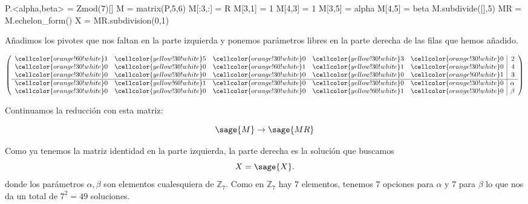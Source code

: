 \documentclass{amsart}
\def\z{\mathbb{Z}}
\begin{document}
\begin{sageblock}
P.<alpha,beta> = Zmod(7)[]
M = matrix(P,5,6)
M[:3,:] = R
M[3,1] = 1
M[4,3] = 1
M[3,5] = alpha
M[4,5] = beta
M.subdivide([],5)
MR = M.echelon_form()
X = MR.subdivision(0,1)
\end{sageblock}

Añadimos los pivotes que nos faltan en la parte izquierda y ponemos parámetros
libres en la parte derecha de las filas que hemos añadido. 

\[
\left(\begin{array}{rrrrr|r}
\cellcolor{orange!60!white} 1 & \cellcolor{yellow!30!white} 5 & \cellcolor{orange!30!white} 0 & \cellcolor{yellow!30!white} 3 & \cellcolor{orange!30!white} 0 & 2 \\
\cellcolor{orange!30!white} 0 & \cellcolor{yellow!30!white} 0 & \cellcolor{orange!60!white} 1 & \cellcolor{yellow!30!white} 1 & \cellcolor{orange!30!white} 0 & 4 \\
\cellcolor{orange!30!white} 0 & \cellcolor{yellow!30!white} 0 & \cellcolor{orange!30!white} 0 & \cellcolor{yellow!30!white} 0 & \cellcolor{orange!60!white} 1 & 3 \\ \hline
\cellcolor{orange!30!white} 0 & \cellcolor{yellow!60!white} 1 & \cellcolor{orange!30!white} 0 & \cellcolor{yellow!30!white} 0 & \cellcolor{orange!30!white} 0 & \alpha \\
\cellcolor{orange!30!white} 0 & \cellcolor{yellow!30!white} 0 & \cellcolor{orange!30!white} 0 & \cellcolor{yellow!60!white} 1 & \cellcolor{orange!30!white} 0 & \beta
\end{array}\right)
\]

Continuamos la reducción con esta matriz:

\[ \sage{M} \to \sage{MR} \]

Como ya tenemos la matriz identidad en la parte izquierda, la parte derecha
es la solución que buscamos
\[ X = \sage{X}. \]
donde los parámetros $\alpha,\beta$ son elementos cualesquiera de $\z_7$. Como 
en $\z_7$ hay $7$ elementos, tenemos $7$ opciones para $\alpha$ y $7$ para $\beta$
lo que nos da un total de $7^2 = 49$ soluciones. 
\end{document}
